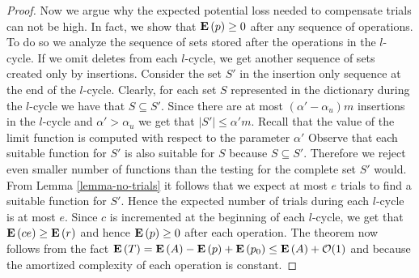 \begin{proof}
Now we argue why the expected potential loss needed to compensate trials can not be high.
In fact, we show that $\mathbf{E}\left(p\right) \geq 0$ after any sequence of operations.
To do so we analyze the sequence of sets stored after the operations in the $l$-cycle.
If we omit deletes from each $l$-cycle, we get another sequence of sets created only by insertions.
Consider the set $S'$ in the insertion only sequence at the end of the $l$-cycle. 
Clearly, for each set $S$ represented in the dictionary during the $l$-cycle we have that $S \subseteq S'$. 
Since there are at most $(\alpha' - \alpha_u)m$ insertions in the $l$-cycle and $\alpha' > \alpha_u$ we get that $|S'| \leq \alpha' m$.
Recall that the value of the limit function is computed with respect to the parameter $\alpha'$
Observe that each suitable function for $S'$ is also suitable for $S$ because $S \subseteq S'$. 
Therefore we reject even smaller number of functions than the testing for the complete set $S'$ would. 
From Lemma \ref{lemma-no-trials} it follows that we expect at most $e$ trials to find a suitable function for $S'$. 
Hence the expected number of trials during each $l$-cycle is at most $e$. 
Since $c$ is incremented at the beginning of each $l$-cycle, we get that $\mathbf{E}\left(ce\right) \geq \mathbf{E}\left(r\right)$ and hence $\mathbf{E}\left(p\right) \geq 0$ after each operation.
The theorem now follows from the fact $\mathbf{E}\left(T\right) = \mathbf{E}\left(A\right) - \mathbf{E}\left(p\right) + \mathbf{E}\left(p_0\right) \leq \mathbf{E}\left(A\right) + \mathcal{O}(1)$ and because the amortized complexity of each operation is constant.
\end{proof}
